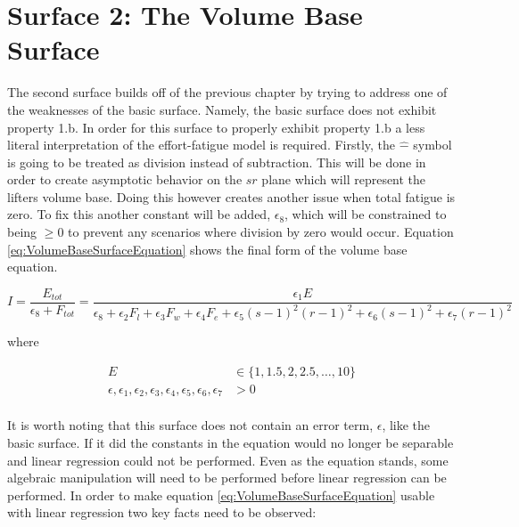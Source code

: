 \chapter{Surface 2: The Volume Base Surface}
\label{sec:PotentialSurfaceTheVolumeBaseSurface}

The second surface builds off of the previous chapter by trying to address one of the weaknesses of the basic surface. Namely, the basic surface does not exhibit property 1.b. In order for this surface to properly exhibit property 1.b a less literal interpretation of the effort-fatigue model is required. Firstly, the $\hat{-}$ symbol is going to be treated as division instead of subtraction. This will be done in order to create asymptotic behavior on the $sr$ plane which will represent the lifters volume base. Doing this however creates another issue when total fatigue is zero. To fix this another constant will be added, $\epsilon_8$, which will be constrained to being $\ge 0$ to prevent any scenarios where division by zero would occur. Equation \ref{eq:VolumeBaseSurfaceEquation} shows the final form of the volume base equation.
 
\begin{minipage}{\textwidth}
	\begin{equation}
		I = \frac{E_{tot}}{\epsilon_8+F_{tot}}= \frac{
			\epsilon_1E
		}{
			\epsilon_8+
			\epsilon_2 F_l+
			\epsilon_3 F_w+
			\epsilon_4 F_e+
			\epsilon_5 (s-1)^2(r-1)^2+
			\epsilon_6 (s-1)^2+
			\epsilon_7 (r-1)^2
		}
		\label{eq:VolumeBaseSurfaceEquation}
	\end{equation}
	\centerline{where}
	\begin{equation*}
	    \begin{split}
	        E & \in \{ 1,1.5,2,2.5, \dots ,10 \} \\
	        \epsilon, \epsilon_1, \epsilon_2, \epsilon_3, \epsilon_4, \epsilon_5,\epsilon_6,\epsilon_7 & > 0 \\
	    \end{split}
	\end{equation*}
\end{minipage}

It is worth noting that this surface does not contain an error term, $\epsilon$, like the basic surface. If it did the constants in the equation would no longer be separable and linear regression could not be performed. Even as the equation stands, some algebraic manipulation will need to be performed before linear regression can be performed. In order to make equation \ref{eq:VolumeBaseSurfaceEquation} usable with linear regression two key facts need to be observed:


